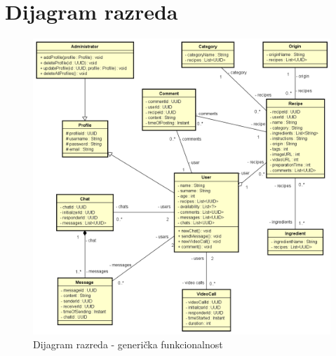 			\eject
			
			
		\section{Dijagram razreda}
			

\begin{figure}[H]
			    \centering
			    \includegraphics[width=1\linewidth]{slike//dijagrami/genericFunctionalityClassDiagram.png}
			    \caption{Dijagram razreda - generička funkcionalnost}
			    \label{fig:enter-label}
			\end{figure}
	\eject		
